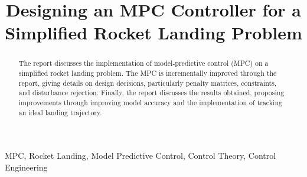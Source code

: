 \documentclass[conference, tikz]{IEEEtran}
\begin{document}
\title{Designing an MPC Controller for a Simplified Rocket Landing Problem}
\author{

}

\maketitle

\begin{abstract}
The report discusses the implementation of model-predictive control (MPC) on a simplified rocket landing problem. The MPC is incrementally improved through the report, giving details on design decisions, particularly penalty matrices, constraints, and disturbance rejection. Finally, the report discusses the results obtained, proposing improvements through improving model accuracy and the implementation of tracking an ideal landing trajectory. 
\end{abstract}

\begin{IEEEkeywords}
MPC, Rocket Landing, Model Predictive Control, Control Theory, Control Engineering
\end{IEEEkeywords}
\end{document}
